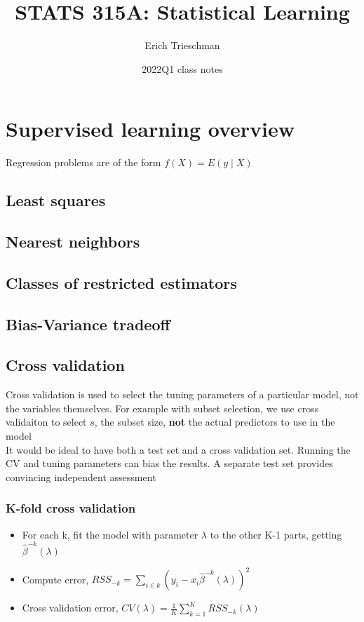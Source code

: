 \documentclass{article}
\title{STATS 315A: Statistical Learning}
\author{Erich Trieschman}
\date{2022Q1 class notes}
\begin{document}
\maketitle

\tableofcontents

\section{Supervised learning overview}
Regression problems are of the form $f(X) = E(y \mid X)$
\subsection{Least squares}
\subsection{Nearest neighbors}
\subsection{Classes of restricted estimators}
\subsection{Bias-Variance tradeoff}
\subsection{Cross validation}
Cross validation is used to select the tuning parameters of a particular model, not the variables themselves. For example with subset selection, we use cross validaiton to select $s$, the subset size, \textbf{not} the actual predictors to use in the model\\
It would be ideal to have both a test set and a cross validation set. Running the CV and tuning parameters can bias the results. A separate test set provides convincing independent assessment
\subsubsection{K-fold cross validation}
\begin{itemize}
  \item For each k, fit the model with parameter $\lambda$ to the other K-1 parts, getting $\hat{\beta}^{-k}(\lambda)$
  \item Compute error, $RSS_{-k} = \sum_{i \in k}(y_i - x_i\hat{\beta}^{-k}(\lambda))^2$
  \item Cross validation error, $CV(\lambda) = \frac{1}{K}\sum_{k=1}^KRSS_{-k}(\lambda)$
\end{itemize}
\end{document}
